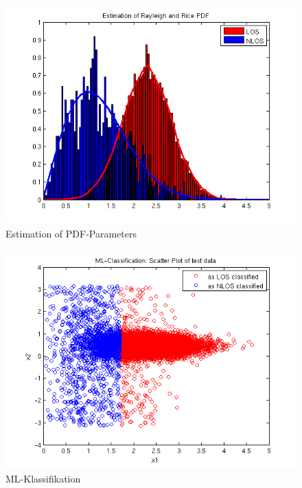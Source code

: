 \begin{figure}[ht!]
 \centering
 \includegraphics[width=17cm]{./figures/5_1_1_estimation.png}
 \caption{Estimation of PDF-Parameters}
 \label{abb:estimation}
\end{figure}


\begin{figure}[ht!]
 \centering
 \includegraphics[width=14cm]{./figures/5_1_1_ml.png}
 \caption{ML-Klassifikation}
 \label{abb:ml}
\end{figure}

